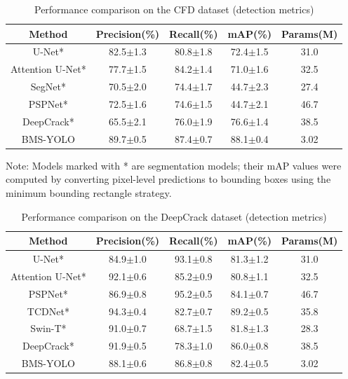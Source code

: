 \documentclass[twocolumn]{sn-jnl}
\begin{document}
	\begin{table}[htbp]
		\centering
		\caption{Performance comparison on the CFD dataset (detection metrics)}
		\begin{tabular}{ccccc}
			\toprule
			Method & Precision(\%) & Recall(\%) & mAP(\%) & Params(M) \\
			\midrule
			U-Net* & 82.5$\pm$1.3 & 80.8$\pm$1.8 & 72.4$\pm$1.5 & 31.0 \\
			Attention U-Net* & 77.7$\pm$1.5 & 84.2$\pm$1.4 & 71.0$\pm$1.6 & 32.5 \\
			SegNet* & 70.5$\pm$2.0 & 74.4$\pm$1.7 & 44.7$\pm$2.3 & 27.4 \\
			PSPNet* & 72.5$\pm$1.6 & 74.6$\pm$1.5 & 44.7$\pm$2.1 & 46.7 \\
			DeepCrack* & 65.5$\pm$2.1 & 76.0$\pm$1.9 & 76.6$\pm$1.4 & 38.5 \\
			BMS-YOLO & 89.7$\pm$0.5 & 87.4$\pm$0.7 & 88.1$\pm$0.4 & 3.02 \\
			\bottomrule
		\end{tabular}
		\label{tab:compare_cfd}
	\end{table}

	Note: Models marked with * are segmentation models; their mAP values were computed by converting pixel-level predictions to bounding boxes using the minimum bounding rectangle strategy.
	
	\begin{table}[htbp]
		\centering
		\caption{Performance comparison on the DeepCrack dataset (detection metrics)}
		\begin{tabular}{ccccc}
			\toprule
			Method & Precision(\%) & Recall(\%) & mAP(\%) & Params(M) \\
			\midrule
			U-Net* & 84.9$\pm$1.0 & 93.1$\pm$0.8 & 81.3$\pm$1.2 & 31.0 \\
			Attention U-Net* & 92.1$\pm$0.6 & 85.2$\pm$0.9 & 80.8$\pm$1.1 & 32.5 \\
			PSPNet* & 86.9$\pm$0.8 & 95.2$\pm$0.5 & 84.1$\pm$0.7 & 46.7 \\
			TCDNet* & 94.3$\pm$0.4 & 82.7$\pm$0.7 & 89.2$\pm$0.5 & 35.8 \\
			Swin-T* & 91.0$\pm$0.7 & 68.7$\pm$1.5 & 81.8$\pm$1.3 & 28.3 \\
			DeepCrack* & 91.9$\pm$0.5 & 78.3$\pm$1.0 & 86.0$\pm$0.8 & 38.5 \\
			BMS-YOLO & 88.1$\pm$0.6 & 86.8$\pm$0.8 & 82.4$\pm$0.5 & 3.02 \\
			\bottomrule
		\end{tabular}
		\label{tab:compare_deepcrack}
	\end{table}
\end{document}
